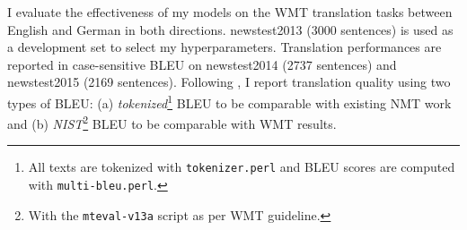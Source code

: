 I evaluate the effectiveness of my models on the WMT translation tasks between
English and German in both directions. newstest2013 (3000 sentences) is used as
a development set to select my hyperparameters. Translation performances are
reported in case-sensitive BLEU \cite{Papineni02bleu} on newstest2014 (2737 sentences) and
newstest2015 (2169 sentences). Following \cite{luong15}, I report
translation quality using two types of BLEU: (a) {\it
tokenized}\footnote{All texts are tokenized with \texttt{tokenizer.perl} and BLEU
scores are computed with \texttt{multi-bleu.perl}.} BLEU to be comparable with
existing NMT work and (b) {\it NIST}\footnote{With the \texttt{mteval-v13a}
script as per WMT guideline.} BLEU to be comparable
with WMT results.

\begin{table*}[tbh!]
\centering
{}
\caption[WMT'14 English-German results]{{\bf WMT'14 English-German results} -- shown are
the perplexities (ppl) and the {\it tokenized} BLEU scores of various systems on newstest2014. I highlight the {\bf
best} system in bold and give {\it progressive} improvements in italic between
consecutive systems. {\it local-p} referes to the local attention with 
predictive alignments. I indicate for each attention model the
alignment score function used in pararentheses. 
}
\label{t:ende}
\end{table*}


